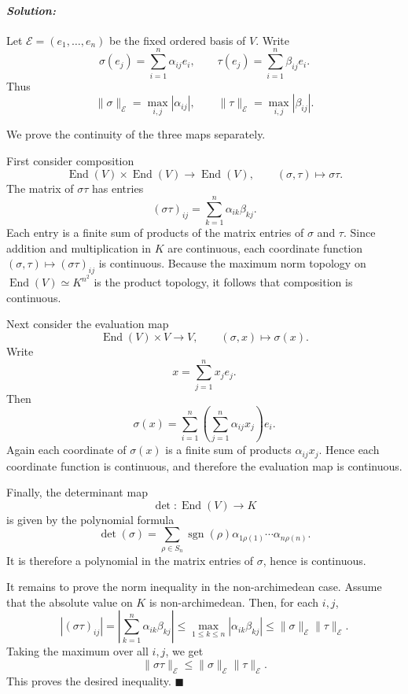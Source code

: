 \documentclass[12pt, a4paper]{article}
\newenvironment{solution}
  {\paragraph{\textit{Solution:}}\par\medskip}
  {\hfill$\blacksquare$\vspace{0.1cm}}
\begin{document}
\begin{solution}
Let \(\mathcal E=(e_1,\dots,e_n)\) be the fixed ordered basis of \(V\). Write
\[
\sigma(e_j)=\sum_{i=1}^n \alpha_{ij}e_i,\qquad
\tau(e_j)=\sum_{i=1}^n \beta_{ij}e_i.
\]
Thus
\[
\|\sigma\|_{\mathcal E}=\max_{i,j}|\alpha_{ij}|,
\qquad
\|\tau\|_{\mathcal E}=\max_{i,j}|\beta_{ij}|.
\]

We prove the continuity of the three maps separately.

First consider composition
\[
\operatorname{End}(V)\times \operatorname{End}(V)\longrightarrow
\operatorname{End}(V),\qquad
(\sigma,\tau)\longmapsto \sigma\tau.
\]
The matrix of \(\sigma\tau\) has entries
\[
(\sigma\tau)_{ij}=\sum_{k=1}^n \alpha_{ik}\beta_{kj}.
\]
Each entry is a finite sum of products of the matrix entries of \(\sigma\) and
\(\tau\). Since addition and multiplication in \(K\) are continuous, each
coordinate function \((\sigma,\tau)\mapsto (\sigma\tau)_{ij}\) is continuous.
Because the maximum norm topology on \(\operatorname{End}(V)\simeq K^{n^2}\)
is the product topology, it follows that composition is continuous.

Next consider the evaluation map
\[
\operatorname{End}(V)\times V\longrightarrow V,\qquad
(\sigma,x)\longmapsto \sigma(x).
\]
Write
\[
x=\sum_{j=1}^n x_je_j.
\]
Then
\[
\sigma(x)=\sum_{i=1}^n\left(\sum_{j=1}^n\alpha_{ij}x_j\right)e_i.
\]
Again each coordinate of \(\sigma(x)\) is a finite sum of products
\(\alpha_{ij}x_j\). Hence each coordinate function is continuous, and therefore
the evaluation map is continuous.

Finally, the determinant map
\[
\det:\operatorname{End}(V)\longrightarrow K
\]
is given by the polynomial formula
\[
\det(\sigma)=
\sum_{\rho\in S_n}\operatorname{sgn}(\rho)
\alpha_{1\rho(1)}\cdots \alpha_{n\rho(n)}.
\]
It is therefore a polynomial in the matrix entries of \(\sigma\), hence is
continuous.

It remains to prove the norm inequality in the non-archimedean case. Assume
that the absolute value on \(K\) is non-archimedean. Then, for each \(i,j\),
\[
|(\sigma\tau)_{ij}|
=
\left|\sum_{k=1}^n \alpha_{ik}\beta_{kj}\right|
\le
\max_{1\le k\le n}|\alpha_{ik}\beta_{kj}|
\le
\|\sigma\|_{\mathcal E}\|\tau\|_{\mathcal E}.
\]
Taking the maximum over all \(i,j\), we get
\[
\|\sigma\tau\|_{\mathcal E}
\le
\|\sigma\|_{\mathcal E}\|\tau\|_{\mathcal E}.
\]
This proves the desired inequality.
\end{solution}
\end{document}
